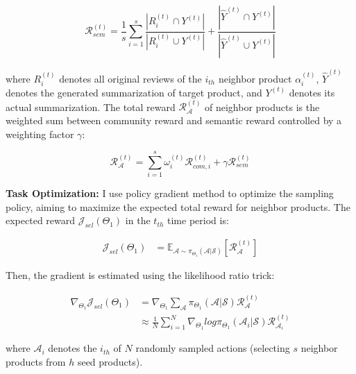 \begin{equation}
\mathcal{R}_{sem}^{(t)} = \frac{1}{s}\sum_{i=1}^{s} \frac{|R_{i}^{(t)} \cap Y^{(t)}|}{|R_{i}^{(t)} \cup Y^{(t)}|} + \frac{|\hat{Y}^{(t)} \cap Y^{(t)}|}{|\hat{Y}^{(t)} \cup Y^{(t)}|} 
\end{equation}

where $R_{i}^{(t)}$ denotes all original reviews of the $i_{th}$ neighbor product $\alpha_{i}^{(t)}$, $\hat{Y}^{(t)}$ denotes the generated summarization of target product, and $Y^{(t)}$ denotes its actual summarization. The total reward $\mathcal{R}^{(t)}_{\mathcal{A}}$ of neighbor products is the weighted sum between community reward and semantic reward controlled by a weighting factor $\gamma$:


\begin{equation}
\mathcal{R}^{(t)}_{\mathcal{A}} = \sum_{i=1}^{s} \omega_{i}^{(t)}\mathcal{R}_{com,i}^{(t)} +\gamma \mathcal{R}_{sem}^{(t)}
\end{equation}

\textbf{Task Optimization:} I use policy gradient method to optimize the sampling policy, aiming to maximize the expected total reward for neighbor products. The expected reward $\mathcal{J}_{sel}(\Theta_{1})$ in the $t_{th}$ time period is:

\begin{equation}
\begin{aligned}
\mathcal{J}_{sel}(\Theta_{1}) &= \mathbb{E}_{\mathcal{A} \sim \pi_{\Theta_{1}}(\mathcal{A}|\mathcal{S})}[\mathcal{R}^{(t)}_{\mathcal{A}}]
\end{aligned}
\end{equation}

Then, the gradient is estimated using the likelihood ratio trick:

\begin{equation}
\label{eq:loss_1}
\begin{aligned}
\nabla_{\Theta_{1}}\mathcal{J}_{sel}(\Theta_{1}) &= \nabla_{\Theta_{1}} \sum_{\mathcal{A}} \pi_{\Theta_{1}}(\mathcal{A}|\mathcal{S}) \mathcal{R}^{(t)}_{\mathcal{A}}\\
&\approx \frac{1}{N} \sum_{i=1}^{N}\nabla_{\Theta_{1}}log\pi_{\Theta_{1}}(\mathcal{A}_{i}|\mathcal{S})\mathcal{R}^{(t)}_{\mathcal{A}_{i}}
\end{aligned}
\end{equation}

where $\mathcal{A}_{i}$ denotes the $i_{th}$ of $N$ randomly sampled actions (selecting $s$ neighbor products from $h$ seed products). 

